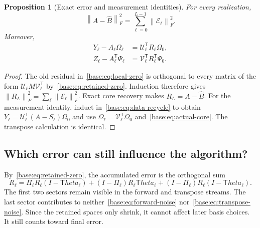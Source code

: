 \documentclass[11pt,oneside,openany,a4paper]{book}
\numberwithin{equation}{chapter}
\newtheorem{proposition}[theorem]{Proposition}
\theoremstyle{definition}
\theoremstyle{remark}
\newcommand{\T}{\mathsf T}\newcommand{\Id}{I}
\newcommand{\F}[1]{\left\lVert#1\right\rVert_F}
\newcommand{\UC}{\mathcal U}\newcommand{\VC}{\mathcal V}\newcommand{\err}{\mathcal E}
\begin{document}
\begin{proposition}[Exact error and measurement identities]\label{base:prop:pythagoras}
For every realization,
\begin{equation}\label{base:eq:pythagoras}
 \F{A-\widehat B}^2=\sum_{\ell=0}^{L-1}\F{\err_\ell}^2.
\end{equation}
Moreover,
\begin{align}
 Y_\ell-A_\ell\Omega_\ell
   &=\UC_\ell^{\T} R_\ell\Omega_0,\label{base:eq:forward-noise}\\
 Z_\ell-A_\ell^{\T}\Psi_\ell
   &=\VC_\ell^{\T} R_\ell^{\T}\Psi_0.\label{base:eq:transpose-noise}
\end{align}
\end{proposition}
\begin{proof}
The old residual in~\eqref{base:eq:local-zero} is orthogonal to every matrix of
the form $\UC_\ell M\VC_\ell^{\T}$ by~\eqref{base:eq:retained-zero}.
Induction therefore gives $\F{R_L}^2=\sum_\ell\F{\err_\ell}^2$.
Exact core recovery makes $R_L=A-\widehat B$.
For the measurement identity, induct in~\eqref{base:eq:data-recycle} to obtain
$Y_\ell=\UC_\ell^{\T}(A-S_\ell)\Omega_0$ and use
$\Omega_\ell=\VC_\ell^{\T}\Omega_0$ and~\eqref{base:eq:actual-core}.
The transpose calculation is identical.\end{proof}

\subsection{Which error can still influence the algorithm?}
By~\eqref{base:eq:retained-zero}, the accumulated error is the orthogonal sum
\begin{equation}\label{base:eq:three-sectors}
 R_\ell=
 \Pi_\ell R_\ell(I-\T heta_\ell)
 +(I-\Pi_\ell)R_\ell\T heta_\ell
 +(I-\Pi_\ell)R_\ell(I-\T heta_\ell).
\end{equation}
The first two sectors remain visible in the forward and transpose streams.
The last sector contributes to neither~\eqref{base:eq:forward-noise}
nor~\eqref{base:eq:transpose-noise}. Since the retained spaces only shrink, it
cannot affect later basis choices. It still counts toward final error.
\end{document}
